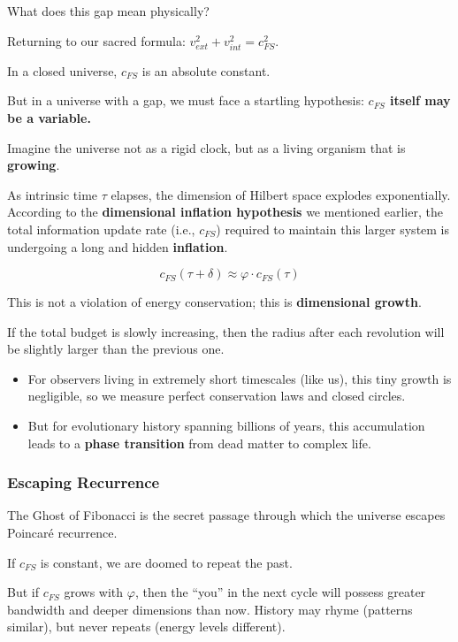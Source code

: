 What does this gap mean physically?

Returning to our sacred formula: $v_{ext}^2 + v_{int}^2 = c_{FS}^2$.

In a closed universe, $c_{FS}$ is an absolute constant.

But in a universe with a gap, we must face a startling hypothesis: \textbf{$c_{FS}$ itself may be a variable.}

Imagine the universe not as a rigid clock, but as a living organism that is \textbf{growing}.

As intrinsic time $\tau$ elapses, the dimension of Hilbert space explodes exponentially. According to the \textbf{dimensional inflation hypothesis} we mentioned earlier, the total information update rate (i.e., $c_{FS}$) required to maintain this larger system is undergoing a long and hidden \textbf{inflation}.

\[c_{FS}(\tau + \delta) \approx \varphi \cdot c_{FS}(\tau)\]

This is not a violation of energy conservation; this is \textbf{dimensional growth}.

If the total budget is slowly increasing, then the radius after each revolution will be slightly larger than the previous one.

\begin{itemize}
\item For observers living in extremely short timescales (like us), this tiny growth is negligible, so we measure perfect conservation laws and closed circles.

\item But for evolutionary history spanning billions of years, this accumulation leads to a \textbf{phase transition} from dead matter to complex life.
\end{itemize}

\subsubsection{Escaping Recurrence}

The Ghost of Fibonacci is the secret passage through which the universe escapes Poincaré recurrence.

If $c_{FS}$ is constant, we are doomed to repeat the past.

But if $c_{FS}$ grows with $\varphi$, then the ``you'' in the next cycle will possess greater bandwidth and deeper dimensions than now. History may rhyme (patterns similar), but never repeats (energy levels different).


